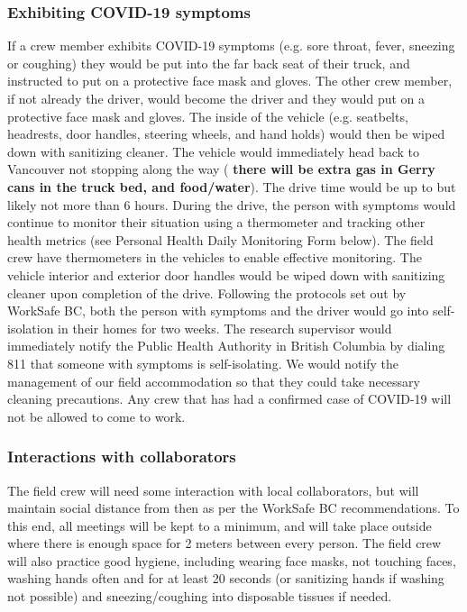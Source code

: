 \documentclass[11pt,letter]{article}
\begin{document}
\subsubsection{Exhibiting COVID-19 symptoms}
If a crew member exhibits COVID-19 symptoms (e.g. sore throat, fever, sneezing or coughing) they would be put into the far back seat of their truck, and instructed to put on a protective face mask and gloves. The other crew member, if not already the driver, would become the driver and they would put on a protective face mask and gloves. The inside of the vehicle (e.g. seatbelts, headrests, door handles, steering wheels, and hand holds) would then be wiped down with sanitizing cleaner. The vehicle would immediately head back to Vancouver not stopping along the way ( \textbf{there will be extra gas in Gerry cans in the truck bed, and food/water}). The drive time would be up to but likely not more than 6 hours. During the drive, the person with symptoms would continue to monitor their situation using a thermometer and tracking other health metrics (see Personal Health Daily Monitoring Form below). The field crew have thermometers in the vehicles to enable effective monitoring. The vehicle interior and exterior door handles would be wiped down with sanitizing cleaner upon completion of the drive. Following the protocols set out by WorkSafe BC, both the person with symptoms and the driver would go into self-isolation in their homes for two weeks. The research supervisor would immediately notify the Public Health Authority in British Columbia by dialing 811 that someone with symptoms is self-isolating. We would notify the management of our field accommodation so that they could take necessary cleaning precautions.  Any crew that has had a confirmed case of COVID-19 will not be allowed to come to work.

\subsubsection{Interactions with collaborators}
The field crew will need some interaction with local collaborators, but will maintain social distance from then as per the WorkSafe BC recommendations. To this end, all meetings will be kept to a minimum, and will take place outside where there is enough space for 2 meters between every person. The field crew will also practice good hygiene, including wearing face masks, not touching faces, washing hands often and for at least 20 seconds (or sanitizing hands if washing not possible) and sneezing/coughing into disposable tissues if needed.  
\end{document}
